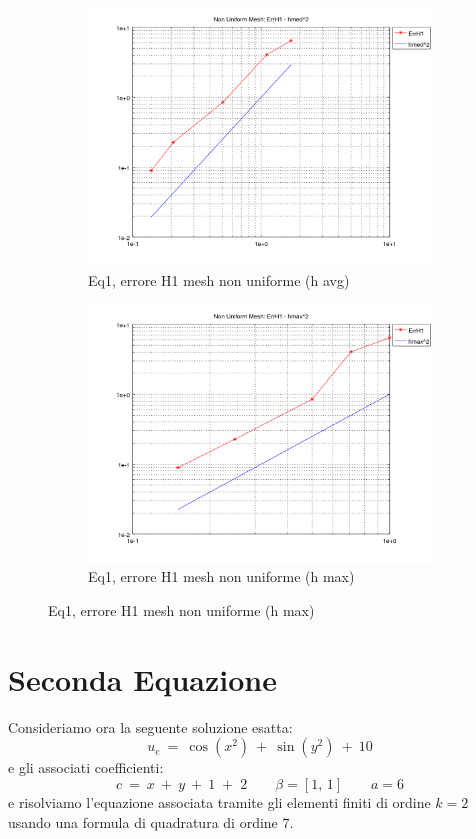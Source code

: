 \documentclass[12pt,a4paper]{report}
\theoremstyle{theorem}
\theoremstyle{theorem}
\theoremstyle{definition}
\begin{document}
\begin{figure}[!h]
	\centering
	\begin{subfigure}[b]{0.49\textwidth}
    		\includegraphics[width=\textwidth]{Eq1-H1avg.png}
    		\caption{Eq1, errore H1 mesh non uniforme (h avg)}
    	\end{subfigure}
    	\begin{subfigure}[b]{0.49\textwidth}
    		\includegraphics[width=\textwidth]{Eq1-H1max.png}
    		\caption{Eq1, errore H1 mesh non uniforme (h max)}
    	\end{subfigure}
\end{figure}




\section{Seconda Equazione}
Consideriamo ora la seguente soluzione esatta:
\[ u_e \ = \ \cos{(x^2)} \ + \ \sin{(y^2)} \ + \ 10 \]
e gli associati coefficienti:
\[ c \ = \ x \ + \ y \ + \ 1 \; + \; 2 \qquad \beta = [1, \, 1] \qquad a = 6 \]
e risolviamo l'equazione associata tramite gli elementi finiti di ordine $k = 2$ usando una formula di quadratura di ordine $7$. 
\end{document}
